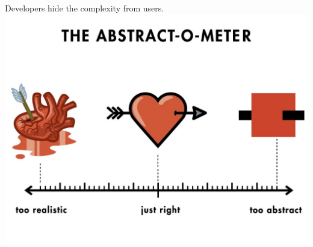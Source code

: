 \documentclass[aspectratio=169, 14pt]{beamer}
\begin{document}
\begin{frame}
\begin{center}
    Developers hide the complexity from users.
    \includegraphics[height=.8\paperheight]{image/heart}
\end{center}
    

\end{frame}
\end{document}
